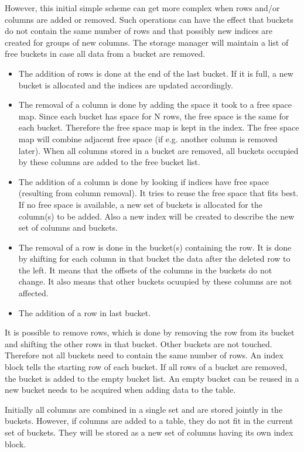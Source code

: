 However, this initial simple scheme can get more complex when
rows and/or columns are added or removed. Such operations can have the
effect that buckets do not contain the same number of rows and that possibly
new indices are created for groups of new columns.
The storage manager will maintain a list of free buckets in case
all data from a bucket are removed.
\begin{itemize}
\item The addition of rows is done at the end of the last bucket. If
  it is full, a new bucket is allocated and the indices are updated
  accordingly.
\item The removal of a column is done by adding the space it took to a
  free space map. Since each bucket has space for N rows, the free
  space is the same for each bucket. Therefore the free space map is
  kept in the index. The free space map will combine adjacent free
  space (if e.g. another column is removed later).
  When all columns stored in a bucket are removed, all buckets
  occupied by these columns are added to the free bucket list.
\item The addition of a column is done by looking if indices have free
  space (resulting from column removal). It tries to reuse the free space
  that fits best. If no free space is available, a new set of buckets
  is allocated for the column(s) to be added. Also a new index will be
  created to describe the new set of columns and buckets. 
\item The removal of a row is done in the bucket(s) containing the
  row. It is done by shifting for each column in that bucket the data
  after the deleted row to the left. It means that the offsets of the
  columns in the buckets do not change. It also means that other
  buckets ocuupied by these columns are not affected. 
\item The addition of a row in last bucket.
\end{itemize}

It is possible to remove rows, which is done by removing the row from
its bucket and shifting the other rows in that bucket. Other buckets
are not touched. Therefore not all buckets need to contain the same
number of rows. 
An index block tells the starting row of each bucket. If all
rows of a bucket are removed, the bucket is added to the empty bucket
list. An empty bucket can be reused in a new bucket needs to be acquired when
adding data to the table.

Initially all columns are combined in a single set and are stored jointly in
the buckets. However, if columns are
added to a table, they do not fit in the current set of buckets. They
will be stored as a new set of
columns having its own index block.


